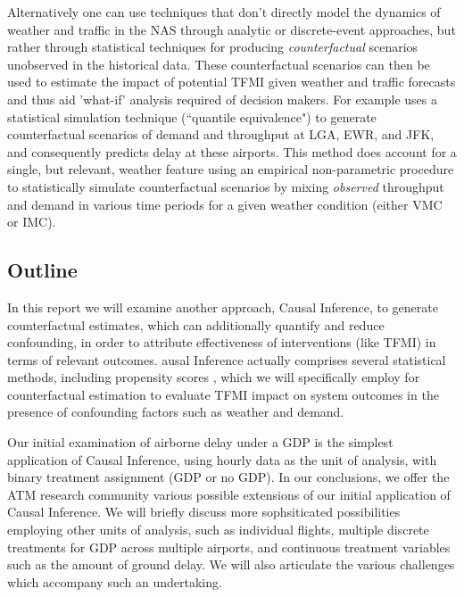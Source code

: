 \documentclass[conference]{IEEEtran}
\begin{document}

Alternatively one can use techniques that don't directly model the dynamics of weather and traffic in the NAS through analytic or discrete-event approaches, but rather through statistical techniques for producing \emph{counterfactual} scenarios unobserved in the historical data.  These counterfactual scenarios can then be used to estimate the impact of potential TFMI given weather and traffic forecasts and thus aid 'what-if' analysis required of decision makers.  For example \cite{kim2013} uses a statistical simulation technique (``quantile equivalence") to generate counterfactual scenarios of demand and throughput at LGA, EWR, and JFK, and consequently predicts delay at these airports.  This method does account for a single, but relevant, weather feature using an empirical non-parametric procedure to statistically simulate counterfactual scenarios by mixing \emph{observed} throughput and demand in various time periods for a given weather condition (either VMC or IMC).  


\subsection{Outline}
In this report we will examine another approach, Causal Inference, to generate counterfactual estimates, which can additionally quantify and reduce confounding, in order to attribute effectiveness of interventions (like TFMI) in terms of relevant outcomes. ausal Inference actually comprises several statistical methods, including propensity scores \cite{austin2011tutorial}, which we will specifically employ for counterfactual estimation to evaluate TFMI impact on system outcomes in the presence of confounding factors such as weather and demand.

Our initial examination of airborne delay under a GDP is the simplest application of Causal Inference, using hourly data as the unit of analysis, with binary treatment assignment (GDP or no GDP).  In our conclusions, we offer the ATM research community various possible extensions of our initial application of Causal Inference. We will briefly discuss more sophsiticated possibilities employing other units of analysis, such as individual flights, multiple discrete treatments for GDP across multiple airports, and continuous treatment variables such as the amount of ground delay.  We will also articulate the various challenges which accompany such an undertaking.  
\end{document}
